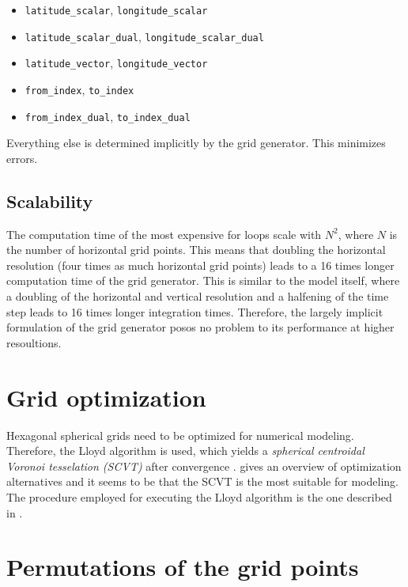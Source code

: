 \documentclass[10pt]{report}
\begin{document}
\begin{itemize}
\item \texttt{latitude\_scalar}, \texttt{longitude\_scalar}
\item \texttt{latitude\_scalar\_dual}, \texttt{longitude\_scalar\_dual}
\item \texttt{latitude\_vector}, \texttt{longitude\_vector}
\item \texttt{from\_index}, \texttt{to\_index}
\item \texttt{from\_index\_dual}, \texttt{to\_index\_dual}
\end{itemize}
%
Everything else is determined implicitly by the grid generator. This minimizes errors.

\subsection{Scalability}
\label{sec:scalability}

The computation time of the most expensive for loops scale with $N^2$, where $N$ is the number of horizontal grid points. This means that doubling the horizontal resolution (four times as much horizontal grid points) leads to a 16 times longer computation time of the grid generator. This is similar to the model itself, where a doubling of the horizontal and vertical resolution and a halfening of the time step leads to 16 times longer integration times. Therefore, the largely implicit formulation of the grid generator posos no problem to its performance at higher resoultions.

\section{Grid optimization}
\label{sec:grid_optimization}

Hexagonal spherical grids need to be optimized for numerical modeling. Therefore, the Lloyd algorithm is used, which yields a \textit{spherical centroidal Voronoi tesselation (SCVT)} after convergence \cite{Du2003}. \cite{PEIXOTO201361} gives an overview of optimization alternatives and it seems to be that the SCVT is the most suitable for modeling. The procedure employed for executing the Lloyd algorithm is the one described in \cite{10.1175/MWR2991.1}.

\section{Permutations of the grid points}
\label{sec:permutations_of_the_grid_points}
\end{document}
